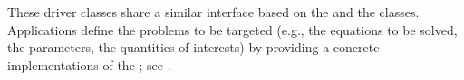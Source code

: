 These driver classes share a similar interface based on the  and the  classes. Applications define the problems to be targeted (e.g., the equations to be solved, the parameters, the quantities of interests) by providing a concrete implementations of the ; see \cite{pawlowski2012automating,pawlowski2012automatingpart2}.

